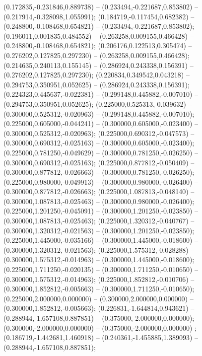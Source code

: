  (0.172835,-0.231846,0.889738) -- (0.233494,-0.221687,0.853802) -- (0.217914,-0.328098,1.055991);
 (0.184719,-0.117454,0.682382) -- (0.248800,-0.108468,0.654821) -- (0.233494,-0.221687,0.853802);
 (0.196011,0.001835,0.484552) -- (0.263258,0.009155,0.466428) -- (0.248800,-0.108468,0.654821);
 (0.206176,0.122513,0.305474) -- (0.276202,0.127825,0.297230) -- (0.263258,0.009155,0.466428);
 (0.214635,0.240113,0.155145) -- (0.286924,0.243338,0.156391) -- (0.276202,0.127825,0.297230);
 (0.220834,0.349542,0.043218) -- (0.294753,0.350951,0.052625) -- (0.286924,0.243338,0.156391);
 (0.224323,0.445637,-0.022381) -- (0.299148,0.445882,-0.007010) -- (0.294753,0.350951,0.052625);
 (0.225000,0.525313,-0.039632) -- (0.300000,0.525312,-0.020963) -- (0.299148,0.445882,-0.007010);
 (0.225000,0.605000,-0.044241) -- (0.300000,0.605000,-0.023400) -- (0.300000,0.525312,-0.020963);
 (0.225000,0.690312,-0.047573) -- (0.300000,0.690312,-0.025163) -- (0.300000,0.605000,-0.023400);
 (0.225000,0.781250,-0.049629) -- (0.300000,0.781250,-0.026250) -- (0.300000,0.690312,-0.025163);
 (0.225000,0.877812,-0.050409) -- (0.300000,0.877812,-0.026663) -- (0.300000,0.781250,-0.026250);
 (0.225000,0.980000,-0.049913) -- (0.300000,0.980000,-0.026400) -- (0.300000,0.877812,-0.026663);
 (0.225000,1.087813,-0.048140) -- (0.300000,1.087813,-0.025463) -- (0.300000,0.980000,-0.026400);
 (0.225000,1.201250,-0.045091) -- (0.300000,1.201250,-0.023850) -- (0.300000,1.087813,-0.025463);
 (0.225000,1.320312,-0.040767) -- (0.300000,1.320312,-0.021563) -- (0.300000,1.201250,-0.023850);
 (0.225000,1.445000,-0.035166) -- (0.300000,1.445000,-0.018600) -- (0.300000,1.320312,-0.021563);
 (0.225000,1.575312,-0.028288) -- (0.300000,1.575312,-0.014963) -- (0.300000,1.445000,-0.018600);
 (0.225000,1.711250,-0.020135) -- (0.300000,1.711250,-0.010650) -- (0.300000,1.575312,-0.014963);
 (0.225000,1.852812,-0.010706) -- (0.300000,1.852812,-0.005663) -- (0.300000,1.711250,-0.010650);
 (0.225000,2.000000,0.000000) -- (0.300000,2.000000,0.000000) -- (0.300000,1.852812,-0.005663);
 (0.226831,-1.644814,0.943621) -- (0.288944,-1.657108,0.887851) -- (0.375000,-2.000000,0.000000);
 (0.300000,-2.000000,0.000000) -- (0.375000,-2.000000,0.000000) ;
 (0.186719,-1.442681,1.460918) -- (0.240361,-1.455885,1.389093) -- (0.288944,-1.657108,0.887851);
